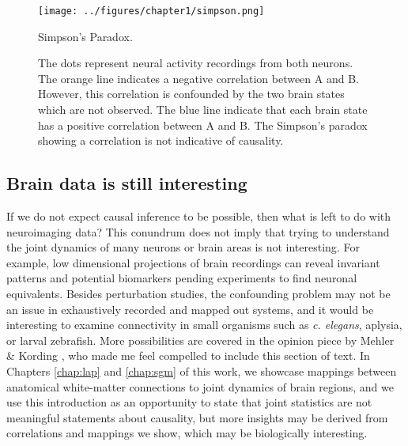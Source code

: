 \begin{figure}[htbp]
	\centering
	\texttt{[image: ../figures/chapter1/simpson.png]}
	\caption{Simpson's Paradox.}
	\caption*{The dots represent neural activity recordings from both neurons. The orange line indicates a negative correlation between A and B. However, this correlation is confounded by the two brain states which are not observed. The blue line indicate that each brain state has a positive correlation between A and B. The Simpson's paradox showing a correlation is not indicative of causality.}
	\label{fig:simpson}
\end{figure}

\subsection{Brain data is still interesting}
If we do not expect causal inference to be possible, then what is left to do with neuroimaging data? This conundrum does not imply that trying to understand the joint dynamics of many neurons or brain areas is not interesting. For example, low dimensional projections of brain recordings can reveal invariant patterns \cite{bruno_spiral_2017,gordon_precision_2017} and potential biomarkers \cite{marceau_biomarker_2018,desowska_dynamics_2019,beijers_data-driven_2019} pending experiments to find neuronal equivalents. Besides perturbation studies, the confounding problem may not be an issue in exhaustively recorded and mapped out systems, and it would be interesting to examine connectivity in small organisms such as \emph{c. elegans}, aplysia, or larval zebrafish. More possibilities are covered in the opinion piece by Mehler \& Kording \cite{mehler_lure_2020}, who made me feel compelled to include this section of text.  In Chapters \ref{chap:lap} and \ref{chap:sgm} of this work, we showcase mappings between anatomical white-matter connections to joint dynamics of brain regions, and we use this introduction as an opportunity to state that joint statistics are not meaningful statements about causality, but more insights may be derived from correlations and mappings we show, which may be biologically interesting.

